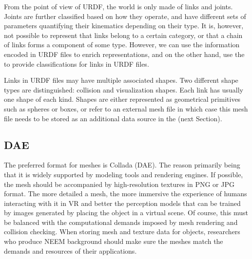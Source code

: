 From the point of view of URDF, the world is only made of links and joints.
Joints are further classified based on how they operate, and have different sets of parameters quantifying their kinematics depending on their type.
It is, however, not possible to represent that links belong to a certain category, or that a chain of links forms a component of some type.
However, we can use the information encoded in URDF files to enrich \neembak representations, and on the other hand, use the \neembak to provide classifications for links in URDF files.

Links in URDF files may have multiple associated shapes.
Two different shape types are distinguished: collision and visualization shapes.
Each link has usually one shape of each kind.
Shapes are either represented as geometrical primitives such as spheres or boxes, or refer to an external mesh file in which case this mesh file needs to be stored as an additional data source in the \neembak (next Section).

\subsection{DAE}
\label{sec:background:dae}

The preferred format for meshes is Collada (DAE).
The reason primarily being that it is widely supported by modeling tools and rendering engines.
If possible, the mesh should be accompanied by high-resolution textures in PNG or JPG format.
The more detailed a mesh, the more immersive the experience of humans interacting with it in VR and better the perception models that can be trained by images generated by placing the object in a virtual scene. Of course, this must be balanced with the computational demands imposed by mesh rendering and collision checking. When storing mesh and texture data for objects, researchers who produce NEEM background should make sure the meshes match the demands and resources of their applications.


